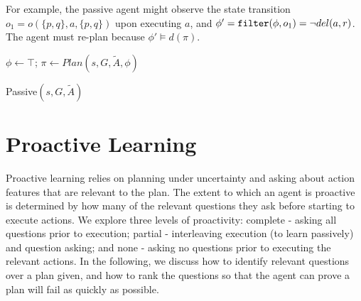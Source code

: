 \documentclass[letterpaper]{article}
\def\goalie{{\tt Goalie}}
\begin{document}
For example, the passive agent might observe the state transition $o_1
= o(\{p,q\}, a, \{p,q\})$ upon executing $a$, and $\phi' = {\tt filter}(\phi,
o_1) = \neg del(a, r)$.  The agent must re-plan because $\phi' \models d(\pi)$.


\begin{algorithm}[t]
\SetLine
{}
 $\phi \leftarrow \top$; $\pi \leftarrow Plan(s, G, \tilde{A}, \phi)$\;
\caption{Passive$(s, G, \tilde{A})$}\label{alg:replan}
\end{algorithm}



\section{Proactive Learning}


Proactive learning relies on planning under uncertainty and asking about action
features that are relevant to the plan.  The extent to which an agent is
proactive is determined by how many of the relevant questions they ask before
starting to execute actions.  We explore three levels of proactivity: complete -
asking all questions prior to execution; partial - interleaving execution (to
learn passively) and question asking; and none - asking no questions prior to
executing the relevant actions.  In the following, we discuss how to identify
relevant questions over a plan given, and how to rank the questions so that the
agent can prove a plan will fail as quickly as possible.
\end{document}
